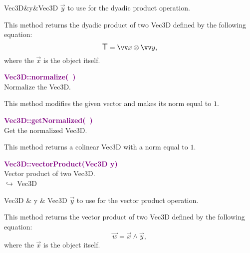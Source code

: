 \begin{tcolorbox}[width=\textwidth,myArgs,tabularx={ll|R}]
Vec3D&y&Vec3D $\overrightarrow{y}$ to use for the dyadic product operation.
\end{tcolorbox}

This method returns the dyadic product of two Vec3D defined by the following equation:
\begin{equation*}
\T = \overrightarrow{x}\otimes\overrightarrow{y},
\end{equation*}
where the $\overrightarrow{x}$ is the object itself.

\textcolor{purple}{\textbf{Vec3D::normalize(~)}}\label{Vec3D::normalize()}\\
Normalize the Vec3D.

This method modifies the given vector and makes its norm equal to $1$.

\textcolor{purple}{\textbf{Vec3D::getNormalized(~)}}\label{Vec3D::getNormalized()}\\
Get the normalized Vec3D.

This method returns a colinear Vec3D with a norm equal to $1$.

\textcolor{purple}{\textbf{Vec3D::vectorProduct(Vec3D y)}}\label{Vec3D::vectorProduct(Vec3D y)}\\
Vector product of two Vec3D.\\ \hspace*{10mm}$\hookrightarrow$ Vec3D

\begin{tcolorbox}[width=\textwidth,myArgs,tabularx={ll|R}]
Vec3D & y & Vec3D $\overrightarrow{y}$ to use for the vector product operation.
\end{tcolorbox}

This method returns the vector product of two Vec3D defined by the following equation:
\begin{equation*}
\overrightarrow{w} = \overrightarrow{x}\land\overrightarrow{y},
\end{equation*}
where the $\overrightarrow{x}$ is the object itself.

